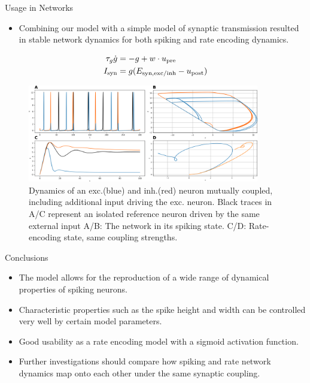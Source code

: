 \documentclass{beamer}
\begin{document}
\begin{frame}[t]
\begin{columns}[t]
\begin{column}{.45\textwidth}
\begin{myblock}{Usage in Networks}
\begin{itemize}
\item Combining our model with a simple model of synaptic transmission resulted in stable network dynamics for both spiking and rate encoding dynamics.
\end{itemize}
\begin{align*}
\tau_g \dot{g} &= -g + w \cdot u_{\rm pre} \\
I_{\rm syn} &= g(E_{\rm syn,exc/inh} - u_{\rm post})
\end{align*}
\begin{figure}
\includegraphics[width=0.9\textwidth]{../figures/graphics/network_dyn_combined.png}
\caption{Dynamics of an exc.(blue) and inh.(red) neuron mutually coupled, including additional input driving the exc. neuron. Black traces in A/C represent an isolated reference neuron driven by the same external input A/B: The network in its spiking state. C/D: Rate-encoding state, same coupling strengths.}
\end{figure}
\end{myblock}

\begin{myblock}{Conclusions}
\begin{itemize}
\item The model allows for the reproduction of a wide range of dynamical properties of spiking neurons.
\item Characteristic properties such as the spike height and width can be controlled very well by certain model parameters.
\item Good usability as a rate encoding model with a sigmoid activation function.
\item Further investigations should compare how spiking and rate network dynamics map onto each other under the same synaptic coupling.
\end{itemize}
\end{myblock}



\end{column}
\end{columns}
\end{frame}
\end{document}
